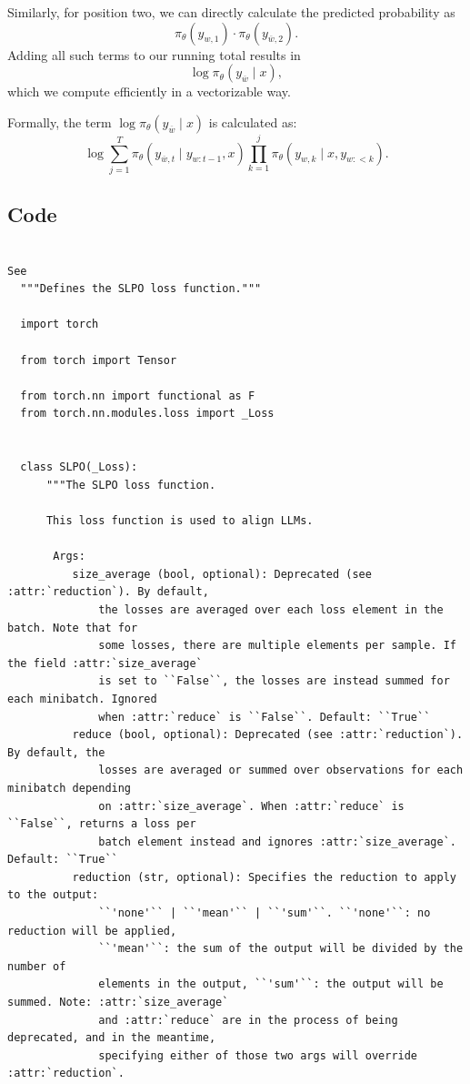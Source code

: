 \documentclass[twoside,11pt]{article}
\begin{document}
Similarly, for position 
two, we can directly calculate the predicted probability as 
\[
\pi_\theta(y_{w, 1}) \cdot \pi_\theta(y_{\overline{w}, 2}).
\]
Adding all such terms to our running total results in 
\[
\log \pi_\theta(y_{\overline{w}} \mid x),
\]
which we compute efficiently in a vectorizable way. 

Formally, the term \(\log \pi_\theta(y_{\overline{w}} \mid x)\) is calculated as:
\[
\log 
\sum_{j=1}^{T} 
  \pi_\theta(y_{\overline{w},t} \mid y_{w:t-1}, x)
\prod_{k=1}^{j} 
  \pi_\theta(y_{w,k} \mid x, y_{w:<k}).
\]


\subsection{Code}

\begin{verbatim}

See 
  """Defines the SLPO loss function."""

  import torch
  
  from torch import Tensor
  
  from torch.nn import functional as F
  from torch.nn.modules.loss import _Loss
  
  
  class SLPO(_Loss):
      """The SLPO loss function.
      
      This loss function is used to align LLMs.
      
       Args:
          size_average (bool, optional): Deprecated (see :attr:`reduction`). By default,
              the losses are averaged over each loss element in the batch. Note that for
              some losses, there are multiple elements per sample. If the field :attr:`size_average`
              is set to ``False``, the losses are instead summed for each minibatch. Ignored
              when :attr:`reduce` is ``False``. Default: ``True``
          reduce (bool, optional): Deprecated (see :attr:`reduction`). By default, the
              losses are averaged or summed over observations for each minibatch depending
              on :attr:`size_average`. When :attr:`reduce` is ``False``, returns a loss per
              batch element instead and ignores :attr:`size_average`. Default: ``True``
          reduction (str, optional): Specifies the reduction to apply to the output:
              ``'none'`` | ``'mean'`` | ``'sum'``. ``'none'``: no reduction will be applied,
              ``'mean'``: the sum of the output will be divided by the number of
              elements in the output, ``'sum'``: the output will be summed. Note: :attr:`size_average`
              and :attr:`reduce` are in the process of being deprecated, and in the meantime,
              specifying either of those two args will override :attr:`reduction`.
      

\end{verbatim}
\end{document}
